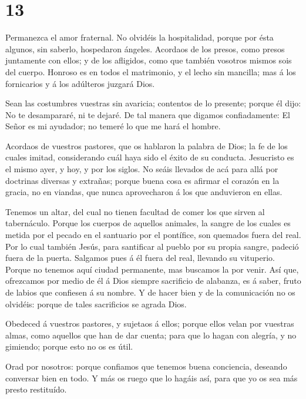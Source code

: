 \hypertarget{section-12}{%
\section{13}\label{section-12}}

 Permanezca el amor fraternal.  No olvidéis la
hospitalidad, porque por ésta algunos, sin saberlo, hospedaron ángeles.
 Acordaos de los presos, como presos juntamente con ellos; y
de los afligidos, como que también vosotros mismos sois del cuerpo.
 Honroso es en todos el matrimonio, y el lecho sin mancilla;
mas á los fornicarios y á los adúlteros juzgará Dios.

 Sean las costumbres vuestras sin avaricia; contentos de lo
presente; porque él dijo: No te desampararé, ni te dejaré. 
De tal manera que digamos confiadamente: El Señor es mi ayudador; no
temeré lo que me hará el hombre.

 Acordaos de vuestros pastores, que os hablaron la palabra
de Dios; la fe de los cuales imitad, considerando cuál haya sido el
éxito de su conducta.  Jesucristo es el mismo ayer, y hoy, y
por los siglos.  No seáis llevados de acá para allá por
doctrinas diversas y extrañas; porque buena cosa es afirmar el corazón
en la gracia, no en viandas, que nunca aprovecharon á los que anduvieron
en ellas.

 Tenemos un altar, del cual no tienen facultad de comer los
que sirven al tabernáculo.  Porque los cuerpos de aquellos
animales, la sangre de los cuales es metida por el pecado en el
santuario por el pontífice, son quemados fuera del real. 
Por lo cual también Jesús, para santificar al pueblo por su propia
sangre, padeció fuera de la puerta.  Salgamos pues á él
fuera del real, llevando su vituperio.  Porque no tenemos
aquí ciudad permanente, mas buscamos la por venir.  Así
que, ofrezcamos por medio de él á Dios siempre sacrificio de alabanza,
es á saber, fruto de labios que confiesen á su nombre.  Y
de hacer bien y de la comunicación no os olvidéis: porque de tales
sacrificios se agrada Dios.

 Obedeced á vuestros pastores, y sujetaos á ellos; porque
ellos velan por vuestras almas, como aquellos que han de dar cuenta;
para que lo hagan con alegría, y no gimiendo; porque esto no os es útil.

 Orad por nosotros: porque confiamos que tenemos buena
conciencia, deseando conversar bien en todo.  Y más os
ruego que lo hagáis así, para que yo os sea más presto restituído.

